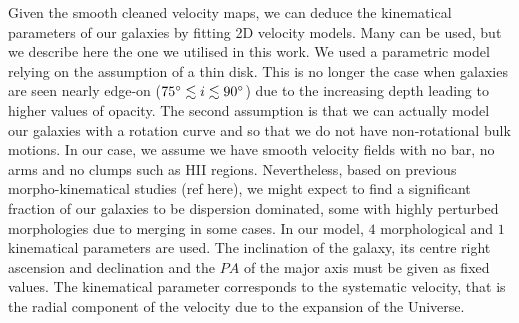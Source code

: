 Given the smooth cleaned velocity maps, we can deduce the kinematical parameters of our galaxies by fitting 2D velocity models. Many can be used, but we describe here the one we utilised in this work. 
We used a parametric model relying on the assumption of a thin disk. This is no longer the case when galaxies are seen nearly edge-on ($75 \degree \lesssim i \lesssim 90 \degree$) due to the increasing depth leading to higher values of opacity. The second assumption is that we can actually model our galaxies with a rotation curve and so that we do not have non-rotational bulk motions. In our case, we assume we have smooth velocity fields with no bar, no arms and no clumps such as HII regions. Nevertheless, based on previous morpho-kinematical studies (ref here), we might expect to find a significant fraction of our galaxies to be dispersion dominated, some with highly perturbed morphologies due to merging in some cases.
In our model, $4$ morphological and $1$ kinematical parameters are used. The inclination of the galaxy, its centre right ascension and declination and the $PA$ of the major axis must be given as fixed values. The kinematical parameter corresponds to the systematic velocity, that is the radial component of the velocity due to the expansion of the Universe.

